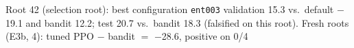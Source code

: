 Root 42 (selection root): best configuration \texttt{ent003} validation 15.3 vs.\ default \ensuremath{-}19.1 and bandit 12.2; test 20.7 vs.\ bandit 18.3 (falsified on this root). Fresh roots (E3b, 4): tuned PPO $-$ bandit $=$ \ensuremath{-}28.6, positive on 0/4